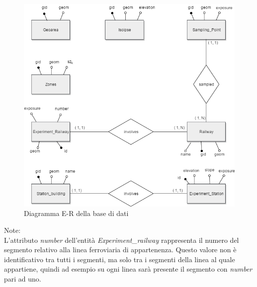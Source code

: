 \begin{figure}[h]
	\centering
	\includegraphics[width=1\textwidth]{img/er}
	\caption{Diagramma E-R della base di dati}
    \label{fig:er}
\end{figure}

Note:\\
L'attributo \textit{number} dell'entità \textit{Experiment\_railway}  rappresenta il numero del segmento relativo alla linea ferroviaria di appartenenza. Questo valore non è identificativo tra tutti i segmenti, ma solo tra i segmenti della linea al quale appartiene, quindi ad esempio su ogni linea sarà presente il segmento con \textit{number} pari ad uno.
\pagebreak

